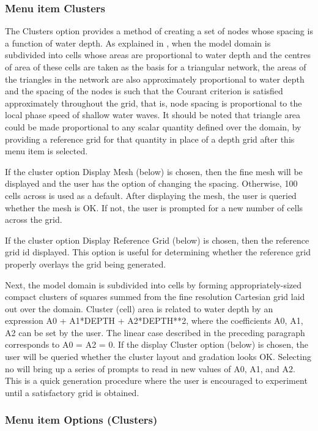 \documentclass{article}
\begin{document}
\subsubsection[Menu item Clusters]{Menu item Clusters}

The Clusters option provides a method of creating a set of nodes whose spacing is a function of water depth. As explained in \cite{HW1992}, when the model domain is subdivided into cells whose areas are proportional to water depth and the centres of area of these cells are taken as the basis for a triangular network, the areas of the triangles in the network are also approximately proportional to water depth and the spacing of the nodes is such that the Courant criterion is satisfied approximately throughout the grid, that is, node spacing is proportional to the local phase speed of shallow water waves. It should be noted that triangle area could be made proportional to any scalar quantity defined over the domain, by providing a reference grid for that quantity in place of a depth grid after this menu item is selected.

If the cluster option Display Mesh (below) is chosen, then the fine mesh will be displayed and the user has the option of changing the spacing. Otherwise, 100 cells across is used as a default. After displaying the mesh, the user is queried whether the mesh is OK. If not, the user is prompted for a new number of cells across the grid.

If the cluster option Display Reference Grid (below) is chosen, then the reference grid id displayed. This option is useful for determining whether the reference grid properly overlays the grid being generated.

Next, the model domain is subdivided into cells by forming appropriately-sized compact clusters of squares summed from the fine resolution Cartesian grid laid out over the domain. Cluster (cell) area is related to water depth by an expression A0 + A1*DEPTH + A2*DEPTH**2, where the coefficients A0, A1, A2 can be set by the user. The linear case described in the preceding paragraph corresponds to A0 = A2 = 0. If the display Cluster option (below) is chosen, the user will be queried whether the cluster layout and gradation looks OK. Selecting no will bring up a series of prompts to read in new values of A0, A1, and A2. This is a quick generation procedure where the user is encouraged to experiment until a satisfactory grid is obtained.

\subsubsection[Menu item Options]{Menu item Options (Clusters)}
\end{document}
